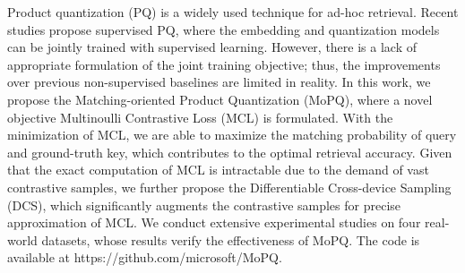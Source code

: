 Product quantization (PQ) is a widely used technique for ad-hoc retrieval. Recent studies propose supervised PQ, where the embedding and quantization models can be jointly trained with supervised learning. However, there is a lack of appropriate formulation of the joint training objective; thus, the improvements over previous non-supervised baselines are limited in reality. In this work, we propose the Matching-oriented Product Quantization (MoPQ), where a novel objective Multinoulli Contrastive Loss (MCL) is formulated. With the minimization of MCL, we are able to maximize the matching probability of query and ground-truth key, which contributes to the optimal retrieval accuracy. Given that the exact computation of MCL is intractable due to the demand of vast contrastive samples, we further propose the Differentiable Cross-device Sampling (DCS), which significantly augments the contrastive samples for precise approximation of MCL. We conduct extensive experimental studies on four real-world datasets, whose results verify the effectiveness of MoPQ. The code is available at https://github.com/microsoft/MoPQ.
